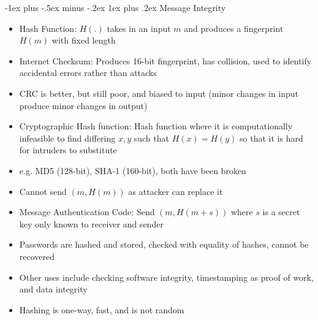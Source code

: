 \documentclass[10pt, landscape]{article}
\makeatletter
\renewcommand{\subsection}{\@startsection{subsection}{3}{0mm}%
                                {-1ex plus -.5ex minus -.2ex}%
                                {1ex plus .2ex}%
                                {\normalfont\small\bfseries}}%
\makeatother
\begin{document}
\begin{multicols*}{3}
\subsection{Message Integrity}
\begin{itemize}
    \item Hash Function: $H(.)$ takes in an input $m$ and produces a fingerprint $H(m)$ with fixed length
    \item Internet Checksum: Produces 16-bit fingerprint, has collision, used to identify accidental errors rather than attacks
    \item CRC is better, but still poor, and biased to input (minor changes in input produce minor changes in output)
    \item Cryptographic Hash function: Hash function where it is computationally infeasible to find differing $x, y$ such that $H(x)=H(y)$ so that it is hard for intruders to substitute
    \item e.g. MD5 (128-bit), SHA-1 (160-bit), both have been broken
    \item Cannot send $(m, H(m))$ as attacker can replace it
    \item Message Authentication Code: Send $(m,H(m+s))$ where $s$ is a secret key only known to receiver and sender
    \item Passwords are hashed and stored, checked with equality of hashes, cannot be recovered
    \item Other uses include checking software integrity, timestamping as proof of work, and data integrity
    \item Hashing is one-way, fast, and is not random
\end{itemize}

\end{multicols*}
\end{document}
